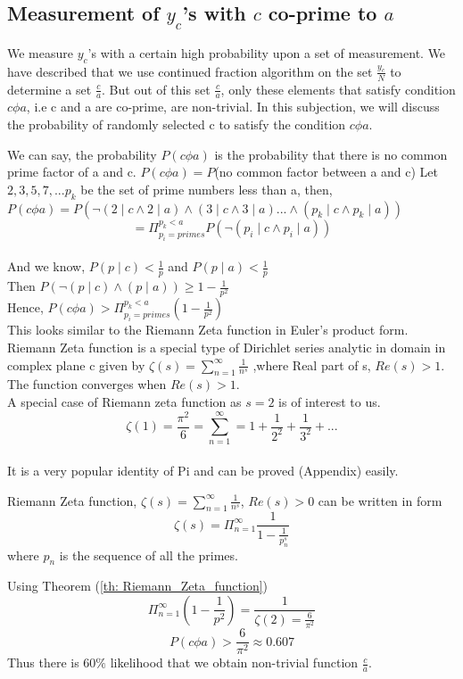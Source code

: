 \subsection{Measurement of $y_c$'s with $c$ co-prime to $a$}
We measure ${y_c}$'s with a certain high probability upon a set of measurement. We have described that we use continued fraction algorithm on the set ${\frac{y_c}{N}}$ to determine a set ${\frac{c}{a}}$. But out of this set $\frac{c}{a}$, only these elements that satisfy condition $c \phi a$, i.e c and a are co-prime, are non-trivial. In this subjection, we will discuss the probability of randomly selected c to satisfy the condition $c \phi a$.

We can say, the probability $P(c \phi a)$ is the probability that there is no common prime factor of a and c.
$P(c \phi a) = P$(no common factor between a and c)
Let ${2, 3, 5, 7, . . . p_k}$ be the set of prime numbers less than a, then,
\\$P(c \phi a) = P(\neg (2 \mid c \wedge 2 \mid a) \wedge (3 \mid c \wedge 3 \mid a) . . . \wedge (p_k \mid c \wedge p_k \mid a)) $\\
    $$= \Pi_{p_i =primes}^{p_k < a} P(\neg (p_i \mid c \wedge p_i \mid a))$$ 
\\And we know, $P(p \mid c ) < \frac{1}{p}$ and $P(p \mid a) < \frac{1}{p}$
\\Then $P(\neg (p \mid c) \wedge (p \mid a)) \geq 1 - \frac{1}{p^2} $
\\Hence, $P(c \phi a) > \Pi_{p_i =primes}^{p_k < a} (1 - \frac{1}{p^2})$
\\This looks similar to the Riemann Zeta function in Euler's product form.
\\Riemann Zeta function is a special type of Dirichlet series analytic in domain in complex plane c given by $\zeta(s) = \sum_{n=1}^\infty \frac{1}{n^s}$ ,where Real part of s, $Re(s)>1$. The function converges when $Re(s) >1 $.
\\A special case of Riemann zeta function as $s=2$ is of interest to us.
\\$$\zeta(1) = \frac{\pi^2}{6} = \sum_{n=1}^\infty = 1 + \frac{1}{2^2} + \frac{1}{3^2} + . . .$$
\\It is a very popular identity of Pi and can be proved (Appendix) easily.
\begin{lemma}
    Riemann Zeta function, $\zeta(s) = \sum_{n=1}^\infty \frac{1}{n^s}$, $Re(s) > 0$ can be written in form
    $$\zeta(s) = \Pi_{n=1}^\infty \frac{1}{1-\frac{1}{p_n^s}} $$ where ${p_n}$ is the sequence of all the primes.
    \label{th: Riemann_Zeta_function}
\end{lemma}
Using Theorem (\ref{th: Riemann_Zeta_function})
$$\Pi_{n=1}^\infty (1-\frac{1}{p^2}) = \frac{1}{\zeta(2) = \frac{6}{\pi^2}}$$
$$P(c \phi a) > \frac{6}{\pi^2 } \approx 0.607$$
Thus there is $60\%$ likelihood that we obtain non-trivial function ${\frac{c}{a}}$.
